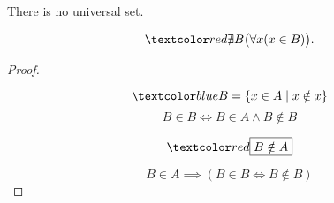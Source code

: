 \begin{frame}{}
  \begin{theorem}
    There is no universal set.

    \[
      \red{\nexists B} \big(\forall x (x \in B) \big).
    \]
  \end{theorem}

  \pause
  \begin{proof}
    \begin{center}
    \end{center}

    \pause
    \[
      \blue{B = \set{x \in A \mid x \notin x}}
    \]
    \pause
    \vspace{-0.30cm}
    \[
      B \in B \iff B \in A \land B \notin B
    \]

    \pause
    \[
      \red{\boxed{B \notin A}}
    \]

    \pause
    \vspace{-0.30cm}
    \[
      B \in A \implies (B \in B \iff B \notin B)
    \]
  \end{proof}
\end{frame}

% 


